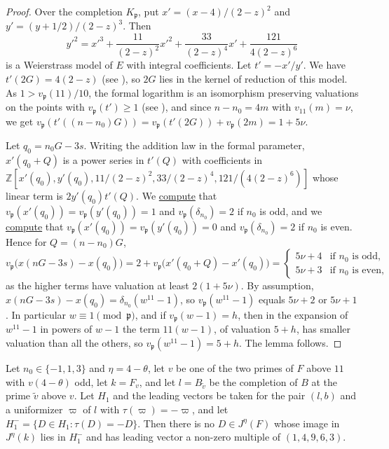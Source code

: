 \documentclass[11pt,reqno]{amsart}
\newcommand{\Z}{\mathbb{Z}}
\newcommand{\fp}{\mathfrak{p}}
\newcommand{\repocommit}{c12c8c3705ed0b6b52254df69bd5ffe84542d568}
\newcommand{\gitlink}[2]{\href{https://github.com/F-Najman/Xns-121-/blob/\repocommit/#1}{#2}}
\newcommand{\githubbare}[1]{\href{https://github.com/F-Najman/Xns-121-/blob/\repocommit/#1}{\path{#1}}}
\theoremstyle{definition}
\numberwithin{equation}{section}
\begin{document}
\begin{proof}
Over the completion $K_\fp$, put $x'=(x-4)/(2-z)^2$ and $y'=(y+1/2)/(2-z)^3$. Then
$$y'^2=x'^3+\frac{11}{(2-z)^2}x'^2+\frac{33}{(2-z)^4}x'+\frac{121}{4(2-z)^6}$$
is a Weierstrass model of $E$ with integral coefficients. Let $t'=-x'/y'$. We have $t'(2G)=4(2-z)$ (see \githubbare{code/even_geometry.m}), so $2G$ lies in the kernel of reduction of this model. As $1>v_\fp(11)/10$, the formal logarithm is an isomorphism preserving valuations on the points with $v_\fp(t')\geq 1$ (see \cite[Section IV.6]{Silverman}), and since $n-n_0=4m$ with $v_{11}(m)=\nu$, we get $v_\fp(t'((n-n_0)G))=v_\fp(t'(2G))+v_\fp(2m)=1+5\nu$.

Let $q_0=n_0G-3s$. Writing the addition law in the formal parameter, $x'(q_0+Q)$ is a power series in $t'(Q)$ with coefficients in $\Z[x'(q_0),y'(q_0),11/(2-z)^2,33/(2-z)^4,121/(4(2-z)^6)]$ whose linear term is $2y'(q_0)t'(Q)$. We \gitlink{code/odd_geometry.m}{compute} that $v_\fp(x'(q_0))=v_\fp(y'(q_0))=1$ and $v_\fp(\delta_{n_0})=2$ if $n_0$ is odd, and we \gitlink{code/even_geometry.m}{compute} that $v_\fp(x'(q_0))=v_\fp(y'(q_0))=0$ and $v_\fp(\delta_{n_0})=2$ if $n_0$ is even. Hence for $Q=(n-n_0)G$,
$$v_\fp\big(x(nG-3s)-x(q_0)\big)=2+v_\fp\big(x'(q_0+Q)-x'(q_0)\big)=\begin{cases}5\nu+4 & \text{if } n_0 \text{ is odd},\\ 5\nu+3 & \text{if } n_0 \text{ is even},\end{cases}$$
as the higher terms have valuation at least $2(1+5\nu)$. By assumption, $x(nG-3s)-x(q_0)=\delta_{n_0}(w^{11}-1)$, so $v_\fp(w^{11}-1)$ equals $5\nu+2$ or $5\nu+1$. In particular $w\equiv 1\pmod\fp$, and if $v_\fp(w-1)=h$, then in the expansion of $w^{11}-1$ in powers of $w-1$ the term $11(w-1)$, of valuation $5+h$, has smaller valuation than all the others, so $v_\fp(w^{11}-1)=5+h$. The lemma follows.
\end{proof}

\begin{lemma}\label{lem:odd_end}
Let $n_0\in\{-1,1,3\}$ and $\eta=4-\theta$, let $v$ be one of the two primes of $F$ above $11$ with $v(4-\theta)$ odd, let $k=F_v$, and let $l=B_{\tilde v}$ be the completion of $B$ at the prime $\tilde v$ above $v$. Let $H_1$ and the leading vectors be taken for the pair $(l,b)$ and a uniformizer $\varpi$ of $l$ with $\tau(\varpi)=-\varpi$, and let $H_1^-=\{D\in H_1:\tau(D)=-D\}$. Then there is no $D\in J^\eta(F)$ whose image in $J^\eta(k)$ lies in $H_1^-$ and has leading vector a non-zero multiple of $(1,4,9,6,3)$.
\end{lemma}
\end{document}
